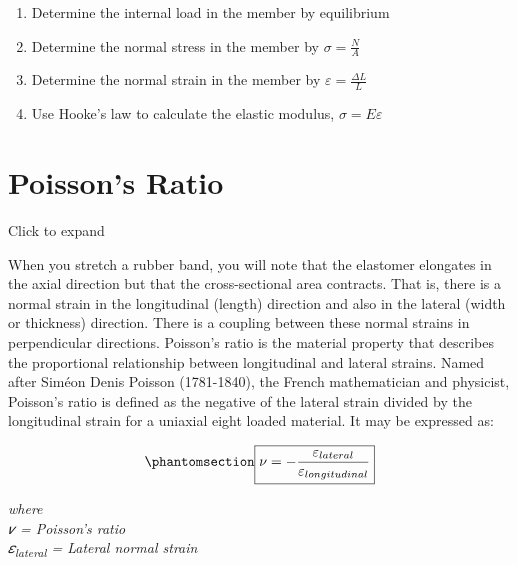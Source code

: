 \documentclass[
  letterpaper,
  DIV=11,
  numbers=noendperiod]{scrreprt}
\providecommand{\tightlist}{%
  \setlength{\itemsep}{0pt}\setlength{\parskip}{0pt}}\usepackage{longtable,booktabs,array}
\theoremstyle{definition}
\theoremstyle{remark}
\begin{document}
\begin{tcolorbox}[enhanced jigsaw, leftrule=.75mm, colbacktitle=quarto-callout-warning-color!10!white, breakable, opacityback=0, colback=white, titlerule=0mm, toprule=.15mm, colframe=quarto-callout-warning-color-frame, coltitle=black, title={Step-by-step:}, toptitle=1mm, bottomrule=.15mm, rightrule=.15mm, left=2mm, arc=.35mm, opacitybacktitle=0.6, bottomtitle=1mm]

\begin{enumerate}
\def\labelenumi{\arabic{enumi}.}
\tightlist
\item
  Determine the internal load in the member by equilibrium
\item
  Determine the normal stress in the member by \(\sigma=\frac{N}{A}\)
\item
  Determine the normal strain in the member by
  \(\varepsilon=\frac{\Delta L}{L}\)
\item
  Use Hooke's law to calculate the elastic modulus,
  \(\sigma=E \varepsilon\)
\end{enumerate}

\end{tcolorbox}

\section{Poisson's Ratio}\label{sec-4.4}

Click to expand

When you stretch a rubber band, you will note that the elastomer
elongates in the axial direction but that the cross-sectional area
contracts. That is, there is a normal strain in the longitudinal
(length) direction and also in the lateral (width or thickness)
direction. There is a coupling between these normal strains in
perpendicular directions. Poisson's ratio is the material property that
describes the proportional relationship between longitudinal and lateral
strains. Named after Siméon Denis Poisson (1781-1840), the French
mathematician and physicist, Poisson's ratio is defined as the negative
of the lateral strain divided by the longitudinal strain for a uniaxial
eight loaded material. It may be expressed as:

\begin{equation}\phantomsection\label{eq-4.2}{
\boxed{\nu=-\frac{\varepsilon_{lateral}}{\varepsilon_{longitudinal}}}
}\end{equation}

\emph{where}\\
\emph{𝜈 = Poisson's ratio}\\
\emph{𝜀\textsubscript{lateral} = Lateral normal strain}
\end{document}
